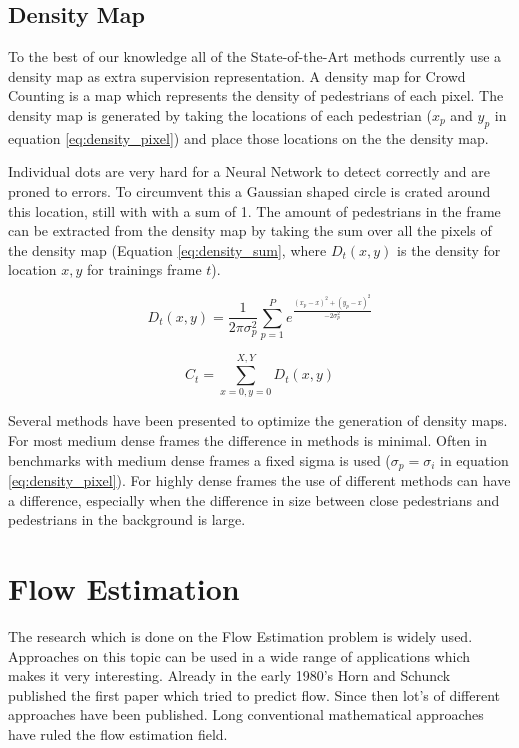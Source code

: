 \subsection{Density Map}
To the best of our knowledge all of the State-of-the-Art methods currently use a density map as extra supervision representation. A density map for Crowd Counting is a map which represents the density of pedestrians of each pixel. The density map is generated by taking the locations of each pedestrian ($x_p$ and $y_p$ in equation \ref{eq:density_pixel}) and place those locations on the the density map.

Individual dots are very hard for a Neural Network to detect correctly and are proned to errors. To circumvent this a Gaussian shaped circle is crated around this location, still with with a sum of 1. The amount of pedestrians in the frame can be extracted from the density map by taking the sum over all the pixels of the density map (Equation \ref{eq:density_sum}, where $D_t(x,y)$ is the density for location $x,y$ for trainings frame $t$).

\begin{equation}
\label{eq:density_pixel}
	D_t(x,y) = \frac{1}{2 \pi \sigma_p^2}\sum^P_{p=1} e^{\frac{(x_p-x)^2+(y_p-x)^2}{-2 \sigma_p^2}}
\end{equation}

\begin{equation}
	\label{eq:density_sum}
	C_t = \sum_{x=0,y=0}^{X,Y} D_t(x,y)
\end{equation}

Several methods have been presented to optimize the generation of density maps. For most medium dense frames the difference in methods is minimal. Often in benchmarks with medium dense frames a fixed sigma is used ($\sigma_p=\sigma_i$ in equation \ref{eq:density_pixel}). For highly dense frames the use of different methods can have a difference, especially when the difference in size between close pedestrians and pedestrians in the background is large.

\section{Flow Estimation}
The research which is done on the Flow Estimation problem is widely used. Approaches on this topic can be used in a wide range of applications which makes it very interesting. Already in the early 1980's Horn and Schunck \cite{Horn1981} published the first paper which tried to predict flow. Since then lot's of different approaches have been published. Long conventional mathematical approaches have ruled the flow estimation field.

